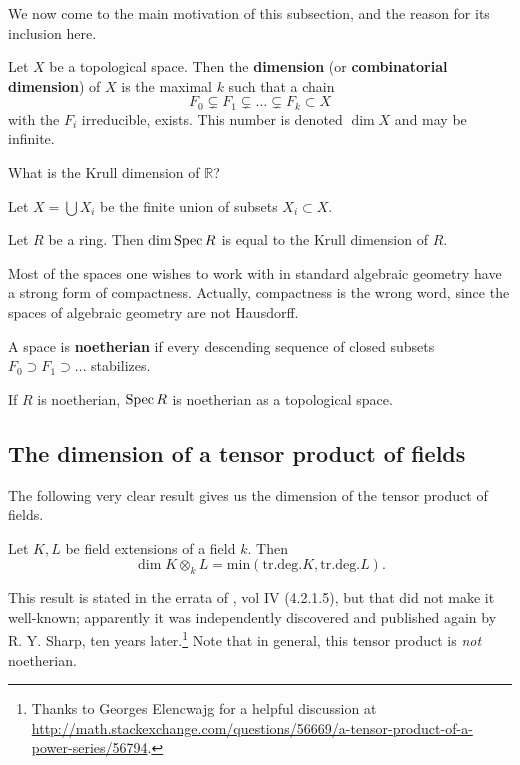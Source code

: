 We now come to the main motivation of this subsection, and the reason for its
inclusion here.

\begin{definition} 
Let $X$ be a topological space. Then the \textbf{dimension} (or
\textbf{combinatorial dimension}) of $X$ is the maximal $k$ such that a chain
\[ F_0 \subsetneq F_1 \subsetneq \dots \subsetneq F_k \subset X  \]
with the $F_i$ irreducible, exists. This number is denoted $\dim X$ and may be
infinite.
\end{definition} 

\begin{exercise} 
What is the Krull dimension of $\mathbb{R}$?
\end{exercise} 

\begin{exercise} 
Let $X = \bigcup X_i$ be the finite union of subsets $X_i \subset X$. 

\end{exercise} 

\begin{exercise} 
Let $R$ be a ring. Then $\mathrm{dim} \operatorname{Spec} R$ is equal to the Krull dimension of $R$. 
\end{exercise} 

Most of the spaces one wishes to work with in standard algebraic geometry have a
strong form of compactness. Actually, compactness is the wrong word, since the
spaces of algebraic geometry are not Hausdorff.

\begin{definition} 
A space is \textbf{noetherian} if every descending sequence of closed subsets
$F_0 \supset F_1 \supset \dots$ stabilizes.
\end{definition} 

\begin{exercise} 
If $R$ is noetherian, $\operatorname{Spec} R$ is noetherian as a topological space.
\end{exercise} 


\subsection{The dimension of a tensor product of fields}

The following very clear result  gives us the dimension of the tensor product
of fields.
\begin{theorem} 
Let $K, L$ be field extensions of a field $k$. Then
\[ \dim K \otimes_k L = \mathrm{min}(\mathrm{tr.deg.} K, \mathrm{tr.deg.} L).  \]
\end{theorem} 
This result is stated in the errata of \cite{EGA}, vol IV (4.2.1.5), but that
did not make it
 well-known; apparently it was independently discovered and published again by R. Y. Sharp, ten years
 later.\footnote{Thanks to Georges Elencwajg for a helpful discussion at 
\url{http://math.stackexchange.com/questions/56669/a-tensor-product-of-a-power-series/56794}.}
Note that in general, this tensor product is \emph{not} noetherian.

